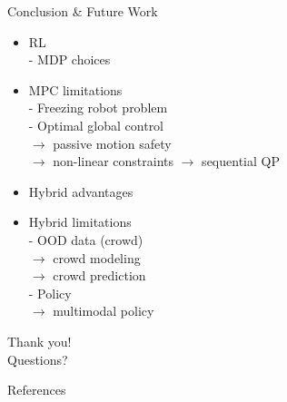 \documentclass[navbaroff]{sdqbeamer}
\begin{document}
\begin{frame}{Conclusion \& Future Work}
    \begin{itemize}
        \item RL\\
            - MDP choices
            \pause
        \item MPC limitations\\
            - Freezing robot problem\\
            \pause
            - Optimal global control\\
            \hspace{4mm}$\rightarrow$ passive motion safety\\
            \hspace{4mm}$\rightarrow$ non-linear constraints $\rightarrow$ sequential QP
            \pause
        \item Hybrid advantages\\
            \pause
        \item Hybrid limitations\\
            - OOD data (crowd)\\
            \hspace{4mm}$\rightarrow$ crowd modeling\\
            \hspace{4mm}$\rightarrow$ crowd prediction\\
            \pause
            - Policy\\
            \hspace{4mm}$\rightarrow$ multimodal policy
    \end{itemize}
\end{frame}

\begin{frame}{}
\centering
    \Fontbig Thank you! \\
    \vspace{1cm}
    \pause
    \Fontvi Questions?
\end{frame}

\beginbackup

\begin{frame}[allowframebreaks]{References}
\printbibliography
\end{frame}
\end{document}
